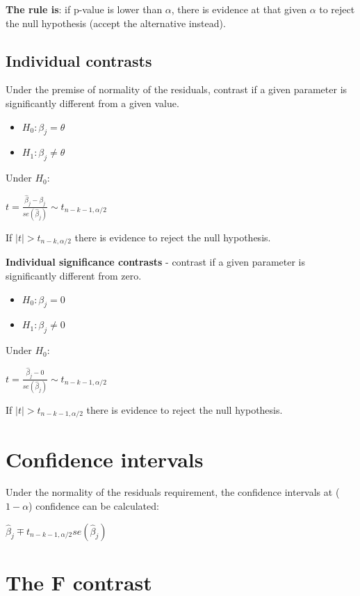 \documentclass[10pt, a4paper, landscape]{extarticle}
\begin{document}
\begin{multicols}{3}
\textbf{The rule is}: if p-value is lower than $\alpha$, there is evidence at that given $\alpha$ to reject the null hypothesis (accept the alternative instead).

\subsection*{Individual contrasts}

Under the premise of normality of the residuals, contrast if a given parameter is significantly different from a given value.

\begin{itemize}[leftmargin=*]
\item $H_0: \beta_j = \theta$
\item $H_1: \beta_j \neq \theta$
\end{itemize}

Under $H_0$:

$t = \frac{\hat{\beta}_j - \beta_j}{se(\hat{\beta}_j)} \sim t_{n-k-1, \alpha/2}$

If $\mid t \mid > t_{n-k, \alpha/2}$ there is evidence to reject the null hypothesis.

\textbf{Individual significance contrasts} - contrast if a given parameter is significantly different from zero.

\begin{itemize}[leftmargin=*]
\item $H_0: \beta_j = 0$
\item $H_1: \beta_j \neq 0$
\end{itemize}

Under $H_0$:

$t = \frac{\hat{\beta}_j - 0}{se(\hat{\beta}_j)} \sim t_{n-k-1, \alpha/2}$

If $\mid t \mid > t_{n-k-1, \alpha/2}$ there is evidence to reject the null hypothesis.

\section*{Confidence intervals}

Under the normality of the residuals requirement, the confidence intervals at ($1 - \alpha$) confidence can be calculated:

$\hat{\beta}_j \mp t_{n-k-1, \alpha/2} se(\hat{\beta}_j)$

\section*{The F contrast}


\end{multicols}
\end{document}
